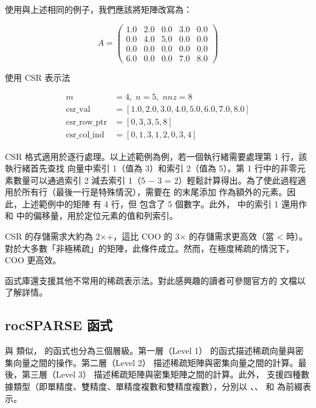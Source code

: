 使用與上述相同的例子，我們應該將矩陣改寫為：

\[
A = \begin{pmatrix} \tag{9.3}
1.0 & 2.0 & 0.0 & 3.0 & 0.0 \\
0.0 & 4.0 & 5.0 & 0.0 & 0.0 \\
0.0 & 0.0 & 0.0 & 0.0 & 0.0 \\
6.0 & 0.0 & 0.0 & 7.0 & 8.0
\end{pmatrix}
\]

使用 CSR 表示法

\[
\begin{aligned} 
m &= 4, \; n = 5, \; nnz = 8 \\
\text{csr\_val} &= [1.0, 2.0, 3.0, 4.0, 5.0, 6.0, 7.0, 8.0] \\
\text{csr\_row\_ptr} &= [0, 3, 3, 5, 8] \\
\text{csr\_col\_ind} &= [0, 1, 3, 1, 2, 0, 3, 4]
\end{aligned} \tag{9.4}
\]

CSR 格式適用於逐行處理。以上述範例為例，若一個執行緒需要處理第 1 行，該執行緒首先查找  向量中索引 1（值為 3）和索引 2（值為 5）。第 1 行中的非零元素數量可以通過索引 2 減去索引 1（5 − 3 = 2）輕鬆計算得出。為了使此過程適用於所有行（最後一行是特殊情況），需要在  的末尾添加  作為額外的元素。因此，上述範例中的矩陣  有 4 行，但  包含了 5 個數字。此外， 中的索引 1 還用作  和  中的偏移量，用於定位元素的值和列索引。

CSR 的存儲需求大約為 2×+，這比 COO 的 3× 的存儲需求更高效（當 < 時）。對於大多數「非極稀疏」的矩陣，此條件成立。然而，在極度稀疏的情況下，COO 更高效。

 函式庫還支援其他不常用的稀疏表示法。對此感興趣的讀者可參閱官方的  文檔以了解詳情。

\subsection{rocSPARSE 函式}
與  類似， 的函式也分為三個層級。第一層（Level 1） 的函式描述稀疏向量與密集向量之間的操作。第二層（Level 2） 描述稀疏矩陣與密集向量之間的計算。最後，第三層（Level 3） 描述稀疏矩陣與密集矩陣之間的計算。此外， 支援四種數據類型（即單精度、雙精度、單精度複數和雙精度複數），分別以 、、 和  為前綴表示。

